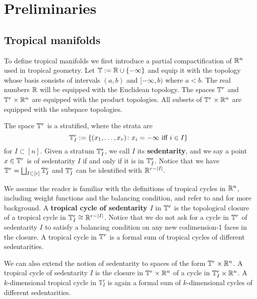 \section{Preliminaries}
 
\subsection{Tropical manifolds}
To define tropical manifolds we first introduce a partial compactification of $\mathbb{R}^n$ used in tropical geometry. Let $\mathbb{T} := \mathbb{R} \cup \{-\infty\}$ and equip it with the topology whose basis consists of intervals $(a, b)$ and $[-\infty, b)$ where $a < b$. The real numbers $\mathbb{R}$ will be equipped with the Euclidean topology. The spaces $\mathbb{T}^r$ and $\mathbb{T}^r \times \mathbb{R}^n$ are equipped with the product topologies. All subsets of $\mathbb{T}^r \times \mathbb{R}^n$ are equipped with the subspace topologies. 

The space $\mathbb{T}^r$ is a stratified,  where the strata are 
$$\mathbb{T}^r_I := \{ (x_1, \dots , x_r)  \colon x_i = -\infty \text{ iff } i \in I\}$$ for 
$I \subset [n]$.
Given a stratum $\mathbb{T}^r_I$, we call $I$ its \textbf{sedentarity}, and we say  a point $x \in \mathbb{T}^r$ is of  sedentarity $I$ if and only if it is in $\mathbb{T}^r_I$.  Notice that we have 
$\mathbb{T}^r = \bigsqcup_{I \subset [r]} \mathbb{T}^r_I$ 
and $\mathbb{T}^r_I$ can be identified with $\mathbb{R}^{r -|I|}$.   

We assume the reader is familiar with the definitions of tropical cycles in $\mathbb{R}^n$, including weight functions and the balancing condition, and refer to \cite{MaclaganSturmfels} and \cite{MikRau} for more background. 
A \textbf{tropical cycle of sedentarity $I$} in $\mathbb{T}^r$ is the topological closure of a tropical cycle in $\mathbb{T}^r_I \cong \mathbb{R}^{r-|I|}$. 
Notice that we do not ask for a cycle in $\mathbb{T}^r$ of sedentarity $I$ to satisfy a balancing condition on any new codimension-1 faces in the closure.
 A tropical cycle in $\mathbb{T}^r$ is a formal sum of tropical cycles of different  sedentarities. 

We can also extend the notion of  sedentarity  to spaces of the form $\mathbb{T}^{r} \times \mathbb{R}^n$. A tropical cycle of sedentarity $I$ is the closure  in $\mathbb{T}^{r} \times \mathbb{R}^n$ of a cycle in $\mathbb{T}^r_I \times \mathbb{R}^n$.   A $k$-dimensional  tropical cycle in $\mathbb{T}^r_I$ is again a formal sum of $k$-dimensional cycles of different sedentarities. 


